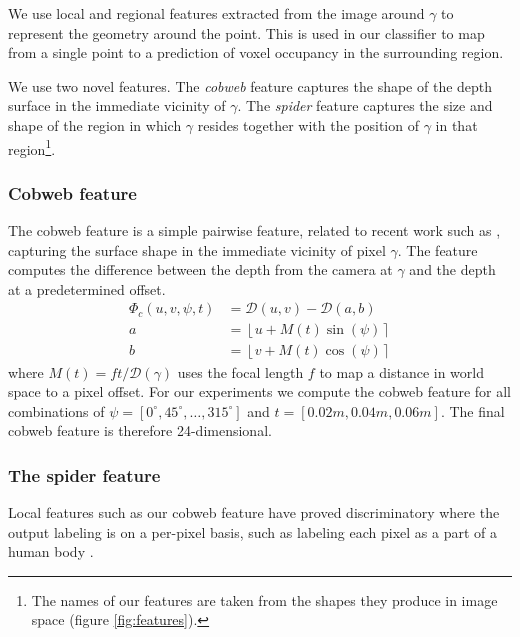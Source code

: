 \documentclass[10pt,twocolumn,letterpaper]{article}
\newcommand{\degree}{^{\circ}}
\newcommand{\rgbdimage}{\mathcal{D}}
\newcommand{\pixelidx}{\gamma}
\newcommand{\note}[1]{\textcolor{blue}{NOTE: #1}}
\begin{document}
We use local and regional features extracted from the image around $\pixelidx$ to represent the geometry around the point.
This is used in our classifier to map from a single point to a prediction of voxel occupancy in the surrounding region.

We use two novel features. 
The \emph{cobweb} feature captures the shape of the depth surface in the immediate vicinity of $\pixelidx$. 
The \emph{spider} feature captures the size and shape of the region in which $\pixelidx$ resides together with the position of $\pixelidx$ in that region\footnote{The names of our features are taken from the shapes they produce in image space (figure \ref{fig:features}).}.


\subsubsection{Cobweb feature }
The cobweb feature is a simple pairwise feature, related to recent work such as \cite{shotton-cvpr-2011, tola-pami-2010}, capturing the surface shape in the immediate vicinity of pixel $\pixelidx$.
The feature computes the difference between the depth from the camera at $\pixelidx$ and the depth at a predetermined offset.
\begin{align}
\Phi_c(u, v, \psi, t) &= \rgbdimage(u, v) - \rgbdimage(a, b) \\
a &= \left\lfloor u + M(t)  \sin(\psi) \right\rceil \\
b &= \left\lfloor v + M(t)  \cos(\psi) \right\rceil
\end{align}
where $M(t) = ft / \rgbdimage(\pixelidx)$ uses the focal length $f$ to map a distance in world space to a pixel offset. For our experiments we compute the cobweb feature for all combinations of $\psi = [0\degree, 45\degree, \ldots, 315\degree]$ and $t = [0.02m, 0.04m, 0.06m]$.
The final cobweb feature is therefore 24-dimensional.

\subsubsection{The spider feature}

Local features such as our cobweb feature have proved discriminatory where the output labeling is on a per-pixel basis, such as labeling each pixel as a part of a human body \cite{shotton-cvpr-2011}.
\end{document}
